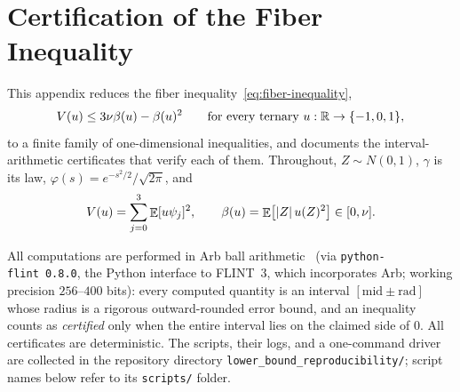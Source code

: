 

\section{Certification of the Fiber Inequality}
\label{app:fiber-certificate}

This appendix reduces the fiber inequality~\eqref{eq:fiber-inequality},
\[
        V(u)\le 3\nu\beta(u)-\beta(u)^2
        \qquad\text{for every ternary } u:\mathbb{R}\to\{-1,0,1\},
\]
to a finite family of one-dimensional inequalities, and documents the interval-arithmetic certificates that verify each of them. Throughout, $Z\sim N(0,1)$, $\gamma$ is its law, $\varphi(s)=e^{-s^2/2}/\sqrt{2\pi}$, and
\[
        V(u)=\sum_{j=0}^3\mathop{\mathbb{E}}[u\psi_j]^2,
        \qquad
        \beta(u)=\mathop{\mathbb{E}}\bigl[|Z|\,u(Z)^2\bigr]\in[0,\nu].
\]

All computations are performed in Arb ball arithmetic~\cite{johansson2017arb} (via \texttt{python-flint~0.8.0}, the Python interface to FLINT~3, which incorporates Arb; working precision $256$--$400$ bits): every computed quantity is an interval $[\text{mid}\pm\text{rad}]$ whose radius is a rigorous outward-rounded error bound, and an inequality counts as \emph{certified} only when the entire interval lies on the claimed side of $0$. All certificates are deterministic. The scripts, their logs, and a one-command driver are collected in the repository directory \texttt{lower\_bound\_reproducibility/}; script names below refer to its \texttt{scripts/} folder.


